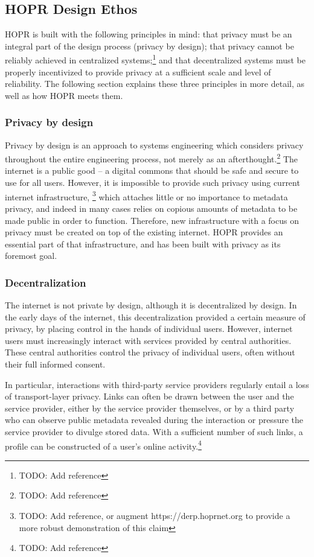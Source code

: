 \subsection{HOPR Design Ethos}
\label{sec:intro:vision}

HOPR is built with the following principles in mind: that privacy must be an integral part of the design process (privacy by design); that privacy cannot be reliably achieved in centralized systems;\footnote{TODO: Add reference} and that decentralized systems must be properly incentivized to provide privacy at a sufficient scale and level of reliability. The following section explains these three principles in more detail, as well as how HOPR meets them.

\subsubsection{Privacy by design}
Privacy by design is an approach to systems engineering which considers privacy throughout the entire engineering process, not merely as an afterthought.\footnote{TODO: Add reference} The internet is a public good – a digital commons that should be safe and secure to use for all users. However, it is impossible to provide such privacy using current internet infrastructure, \footnote{TODO: Add reference, or augment https://derp.hoprnet.org to provide a more robust demonstration of this claim} which attaches little or no importance to metadata privacy, and indeed in many cases relies on copious amounts of metadata to be made public in order to function. Therefore, new infrastructure with a focus on privacy must be created on top of the existing internet. HOPR provides an essential part of that infrastructure, and has been built with privacy as its foremost goal.

\subsubsection{Decentralization}
The internet is not private by design, although it is decentralized by design. In the early days of the internet, this decentralization provided a certain measure of privacy, by placing control in the hands of individual users. However, internet users must increasingly interact with services provided by central authorities. These central authorities control the privacy of individual users, often without their full informed consent.

In particular, interactions with third-party service providers regularly entail a loss of transport-layer privacy. Links can often be drawn between the user and the service provider, either by the service provider themselves, or by a third party who can observe public metadata revealed during the interaction or pressure the service provider to divulge stored data. With a sufficient number of such links, a profile can be constructed of a user's online activity.\footnote{TODO: Add reference}

